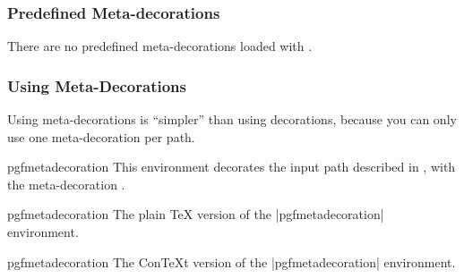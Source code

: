 \subsubsection{Predefined Meta-decorations}

There are no predefined meta-decorations loaded with \pgfname{}.


\subsubsection{Using Meta-Decorations}

Using meta-decorations is ``simpler'' than using decorations, because you can
only use one meta-decoration per path.

\begin{environment}{{pgfmetadecoration}}
    This environment decorates the input path described in , with the meta-decoration .
\end{environment}

\begin{plainenvironment}{{pgfmetadecoration}}
    The plain \TeX{} version of the |{pgfmetadecoration}| environment.
\end{plainenvironment}

\begin{contextenvironment}{{pgfmetadecoration}}
    The Con\TeX t version of the |{pgfmetadecoration}| environment.
\end{contextenvironment}
